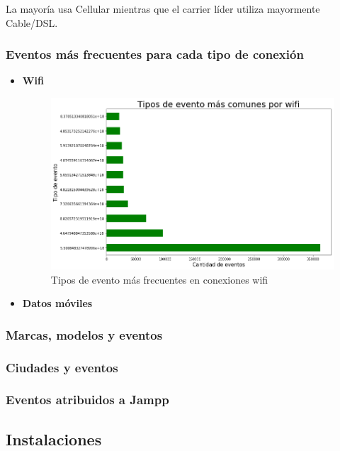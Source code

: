 \documentclass[a4paper, 12pt]{article}
\begin{document}
		La mayoría usa Cellular mientras que el carrier líder utiliza mayormente Cable/DSL.
		
		\subsubsection*{Eventos más frecuentes para cada tipo de conexión}
		
			\begin{itemize}
				\item \textbf{Wifi}
				\FloatBarrier
				\begin{figure}[h]
					\centering
					\includegraphics[width=\textwidth]{images/events/eventsxwifi.png}
					\caption{Tipos de evento más frecuentes en conexiones wifi}
				\end{figure}
				\FloatBarrier
				\item \textbf{Datos móviles}
			\end{itemize}
	\subsubsection{Marcas, modelos y eventos}
	
	\subsubsection{Ciudades y eventos}
	
	\subsubsection{Eventos atribuidos a Jampp}
		
\clearpage
\subsection{Instalaciones}
\end{document}
